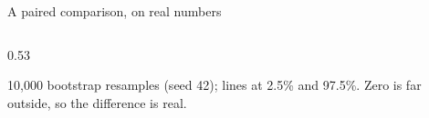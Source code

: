 \begin{frame}{A paired comparison, on real numbers\hfill\ours\ }
\begin{columns}[c]
\begin{column}{0.53\textwidth}
\begin{uncoverenv}
      {\tiny\color{kdgray} 10,000 bootstrap resamples (seed 42); lines at 2.5\% and 97.5\%.
      Zero is far outside, so the difference is real.}
      \end{uncoverenv}
    \end{column}
  \end{columns}
\end{frame}
